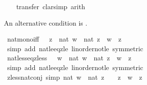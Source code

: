 \begin{isabellebody}
%
\isadelimproof
\ \ %
\endisadelimproof
%
\isatagproof
{}\isamarkupfalse%
\ transfer\ {\isacharparenleft}{\kern0pt}clarsimp{\isacharcomma}{\kern0pt}\ arith{\isacharparenright}{\kern0pt}%
\endisatagproof
{\isafoldproof}%
%
\isadelimproof
%
\endisadelimproof
%
\begin{isamarkuptext}%
An alternative condition is .%
\end{isamarkuptext}\isamarkuptrue%
\isamarkupfalse%
\ nat{\isacharunderscore}{\kern0pt}mono{\isacharunderscore}{\kern0pt}iff{\isacharcolon}{\kern0pt}\ {\isachardoublequoteopen}{}\ {\isacharless}{\kern0pt}\ z\ {\isasymLongrightarrow}\ nat\ w\ {\isacharless}{\kern0pt}\ nat\ z\ {\isasymlongleftrightarrow}\ w\ {\isacharless}{\kern0pt}\ z{\isachardoublequoteclose}\isanewline
%
\isadelimproof
\ \ %
\endisadelimproof
%
\isatagproof
{}\isamarkupfalse%
\ {\isacharparenleft}{\kern0pt}simp\ add{\isacharcolon}{\kern0pt}\ nat{\isacharunderscore}{\kern0pt}le{\isacharunderscore}{\kern0pt}eq{\isacharunderscore}{\kern0pt}zle\ linorder{\isacharunderscore}{\kern0pt}not{\isacharunderscore}{\kern0pt}le\ {\isacharbrackleft}{\kern0pt}symmetric{\isacharbrackright}{\kern0pt}{\isacharparenright}{\kern0pt}%
\endisatagproof
{\isafoldproof}%
%
\isadelimproof
\isanewline
%
\endisadelimproof
\isanewline
{}\isamarkupfalse%
\ nat{\isacharunderscore}{\kern0pt}less{\isacharunderscore}{\kern0pt}eq{\isacharunderscore}{\kern0pt}zless{\isacharcolon}{\kern0pt}\ {\isachardoublequoteopen}{}\ {\isasymle}\ w\ {\isasymLongrightarrow}\ nat\ w\ {\isacharless}{\kern0pt}\ nat\ z\ {\isasymlongleftrightarrow}\ w\ {\isacharless}{\kern0pt}\ z{\isachardoublequoteclose}\isanewline
%
\isadelimproof
\ \ %
\endisadelimproof
%
\isatagproof
{}\isamarkupfalse%
\ {\isacharparenleft}{\kern0pt}simp\ add{\isacharcolon}{\kern0pt}\ nat{\isacharunderscore}{\kern0pt}le{\isacharunderscore}{\kern0pt}eq{\isacharunderscore}{\kern0pt}zle\ linorder{\isacharunderscore}{\kern0pt}not{\isacharunderscore}{\kern0pt}le\ {\isacharbrackleft}{\kern0pt}symmetric{\isacharbrackright}{\kern0pt}{\isacharparenright}{\kern0pt}%
\endisatagproof
{\isafoldproof}%
%
\isadelimproof
\isanewline
%
\endisadelimproof
\isanewline
{}\isamarkupfalse%
\ zless{\isacharunderscore}{\kern0pt}nat{\isacharunderscore}{\kern0pt}conj\ {\isacharbrackleft}{\kern0pt}simp{\isacharbrackright}{\kern0pt}{\isacharcolon}{\kern0pt}\ {\isachardoublequoteopen}nat\ w\ {\isacharless}{\kern0pt}\ nat\ z\ {\isasymlongleftrightarrow}\ {}\ {\isacharless}{\kern0pt}\ z\ {\isasymand}\ w\ {\isacharless}{\kern0pt}\ z{\isachardoublequoteclose}\isanewline

\end{isabellebody}
